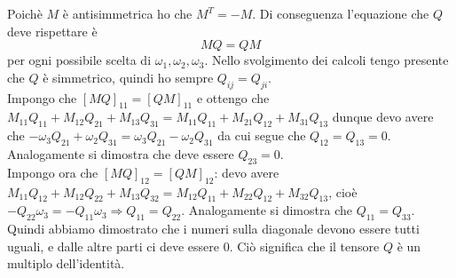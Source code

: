 \documentclass[../main.tex]{subfiles}
\begin{document}
Poichè $M$ è antisimmetrica ho che $M^T=-M$. Di conseguenza l'equazione che $Q$ deve rispettare è 
\begin{equation}
 MQ=QM
\end{equation}
per ogni possibile scelta di $\omega_1, \omega_2, \omega_3$. Nello svolgimento dei calcoli tengo presente che $Q$ è simmetrico, quindi ho sempre $Q_{ij}=Q_{ji}$.\\
Impongo che $[MQ]_{11} = [QM]_{11}$ e ottengo che $M_{11}Q_{11}+M_{12}Q_{21}+M_{13}Q_{31} = M_{11}Q_{11}+M_{21}Q_{12}+M_{31}Q_{13}$ dunque devo avere che
$-\omega_3Q_{21}+\omega_2Q_{31} = \omega_3Q_{21}-\omega_2Q_{31}$ da cui segue che $Q_{12}=Q_{13} = 0$. Analogamente si dimostra che deve essere $Q_{23}=0$.\\
Impongo ora che $[MQ]_{12} = [QM]_{12}$: devo avere $M_{11}Q_{12}+M_{12}Q_{22}+M_{13}Q_{32} = M_{12}Q_{11}+M_{22}Q_{12}+M_{32}Q_{13}$, cioè
$ -Q_{22}\omega_3 = -Q_{11}\omega_3 \Rightarrow Q_{11}=Q_{22}$. Analogamente si dimostra che $Q_{11}=Q_{33}$.\\
Quindi abbiamo dimostrato che i numeri sulla diagonale devono essere tutti uguali, e dalle altre parti ci deve essere 0. Ciò significa che il tensore $Q$ è un multiplo dell'identità.
\end{document}
